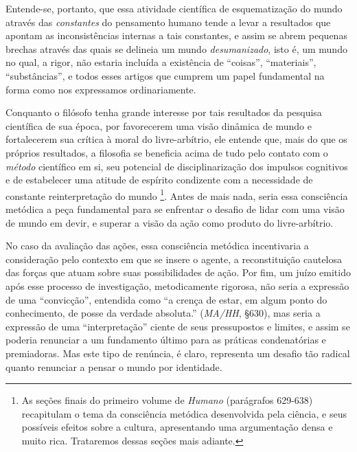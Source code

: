 \documentclass[
	12pt,				%
	openright,			%
	oneside,			%
	a4paper,			%
	english,			%
	french,				%
	spanish,			%
	brazil				%
	]{abntex2}
\begin{document}
Entende-se, portanto, que essa atividade científica de esquematização do mundo através das \textit{constantes} do pensamento humano tende a levar a resultados que apontam as inconsistências internas a tais constantes, e assim se abrem pequenas brechas através das quais se delineia um mundo \textit{desumanizado}, isto é, um mundo no qual, a rigor, não estaria incluída a existência de “coisas”, “materiais”, “substâncias”, e todos esses artigos que cumprem um papel fundamental na forma como nos expressamos ordinariamente.

	Conquanto o filósofo tenha grande interesse por tais resultados da pesquisa científica de sua época, por favorecerem uma visão dinâmica de mundo e fortalecerem sua crítica à moral do livre-arbítrio, ele entende que, mais do que os próprios resultados, a filosofia se beneficia acima de tudo pelo contato com o \textit{método} científico em si, seu potencial de disciplinarização dos impulsos cognitivos e de estabelecer uma atitude de espírito condizente com a necessidade de constante reinterpretação do mundo
\footnote{As seções finais do primeiro volume de \textit{Humano} (parágrafos 629-638) recapitulam o tema da consciência metódica desenvolvida pela ciência, e seus possíveis efeitos sobre a cultura, apresentando uma argumentação densa e muito rica. Trataremos dessas seções mais adiante.}. 
Antes de mais nada, seria essa consciência metódica a peça fundamental para se enfrentar o desafio de lidar com uma visão de mundo em devir, e superar a visão da ação como produto do livre-arbítrio.

No caso da avaliação das ações, essa consciência metódica incentivaria a consideração pelo contexto em que se insere o agente, a reconstituição cautelosa das forças que atuam sobre suas possibilidades de ação. Por fim, um juízo emitido após esse processo de investigação, metodicamente rigorosa, não seria a expressão de uma “convicção”, entendida como “a crença de estar, em algum ponto do conhecimento, de posse da verdade absoluta.” (\textit{MA/HH}, §630), mas seria a expressão de uma “interpretação” ciente de seus pressupostos e limites, e assim se poderia renunciar a um fundamento último para as práticas condenatórias e premiadoras. Mas este tipo de renúncia, é claro, representa um desafio tão radical quanto renunciar a pensar o mundo por identidade.
\end{document}
